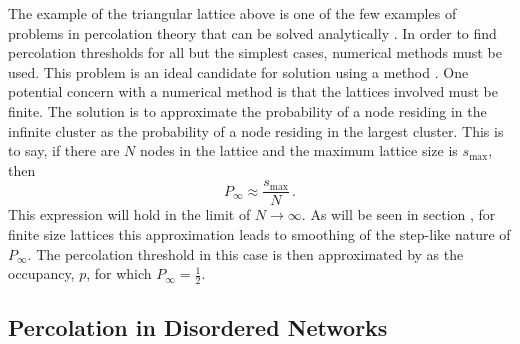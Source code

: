 The example of the triangular lattice above is one of the few examples of problems in percolation theory that can be solved analytically \cite{Kirkpatrick1973}.
In order to find percolation thresholds for all but the simplest cases, numerical methods must be used.
This problem is an ideal candidate for solution using a \mc{} method \cite{Frisch1962,Dean1967}.
One potential concern with a numerical method is that the lattices involved must be finite.
The solution is to approximate the probability of a node residing in the infinite cluster as the probability of a node residing in the largest cluster. 
This is to say, if there are $N$ nodes in the lattice and the maximum lattice size is $s_{\text{max}}$, then
\begin{equation}
	P_{\infty}\approx \frac{s_\text{max}}{N}\,.
\end{equation} 
This expression will hold in the limit of $N\rightarrow \infty$.
As will be seen in section , for finite size lattices this approximation leads to smoothing of the step\--like nature of $P_{\infty}$.
The percolation threshold in this case is then approximated by as the occupancy, $p$, for which $P_{\infty}=\frac{1}{2}$.

\subsection{Percolation in Disordered Networks}

